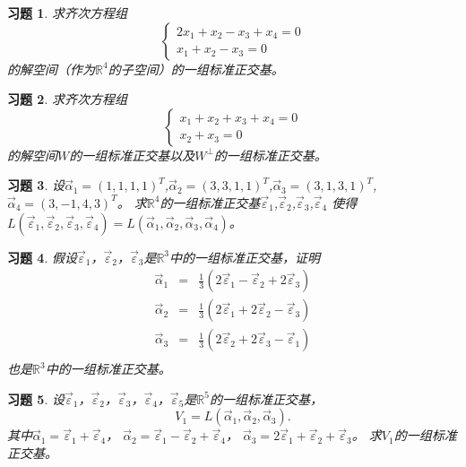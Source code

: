 \documentclass[a4paper]{book}
\newtheorem{ex}{习题}[chapter]
\begin{document}
\begin{ex}\label{6.13}
求齐次方程组
\begin{equation*}
  \begin{cases}
  2x_1+x_2-x_3+x_4=0\\
  x_1+x_2-x_3=0
  \end{cases}
\end{equation*}
的解空间（作为$\mathbb{R}^4$的子空间）的一组标准正交基。
\end{ex}

\begin{ex}\label{6.14}
求齐次方程组
\begin{equation*}
  \begin{cases}
  x_1+x_2+x_3+x_4=0\\
  x_2+x_3=0
  \end{cases}
\end{equation*}
的解空间$W$的一组标准正交基以及$W^{\bot}$的一组标准正交基。
\end{ex}

\begin{ex}\label{6.15}
设$\vec{\alpha}_1=(1,1,1,1)^T$,$\vec{\alpha}_2=(3,3,1,1)^T$,$\vec{\alpha}_3=(3,1,3,1)^T$,$\vec{\alpha}_4=(3,-1,4,3)^T$。
求$\mathbb{R}^4$的一组标准正交基$\vec{\varepsilon}_1$,$\vec{\varepsilon}_2$,$\vec{\varepsilon}_3$,$\vec{\varepsilon}_4$ 使得\\
$L(\vec{\varepsilon}_1,\vec{\varepsilon}_2,\vec{\varepsilon}_3,\vec{\varepsilon}_4)=L(\vec{\alpha}_1,\vec{\alpha}_2,\vec{\alpha}_3,\vec{\alpha}_4)$。
\end{ex}

\begin{ex}\label{6.16}
假设$\vec{\varepsilon}_1$，$\vec{\varepsilon}_2$，$\vec{\varepsilon}_3$是$\mathbb{R}^3$中的一组标准正交基，证明
\begin{eqnarray*}
 \vec{\alpha}_1 &=& \frac{1}{3}(2\vec{\varepsilon}_1-\vec{\varepsilon}_2+2\vec{\varepsilon}_3) \\
 \vec{\alpha}_2 &=& \frac{1}{3}(2\vec{\varepsilon}_1+2\vec{\varepsilon}_2-\vec{\varepsilon}_3) \\
 \vec{\alpha}_3 &=& \frac{1}{3}(2\vec{\varepsilon}_2+2\vec{\varepsilon}_3-\vec{\varepsilon}_1) \\
\end{eqnarray*}
也是$\mathbb{R}^3$中的一组标准正交基。
\end{ex}

\begin{ex}\label{6.17}
设$\vec{\varepsilon}_1$，$\vec{\varepsilon}_2$，$\vec{\varepsilon}_3$，$\vec{\varepsilon}_4$，$\vec{\varepsilon}_5$是$\mathbb{R}^5$的一组标准正交基，
\begin{equation*}
  V_1=L(\vec{\alpha}_1,\vec{\alpha}_2,\vec{\alpha}_3).
\end{equation*}
其中$\vec{\alpha}_1=\vec{\varepsilon}_1+\vec{\varepsilon}_4$，
$\vec{\alpha}_2=\vec{\varepsilon}_1-\vec{\varepsilon}_2+\vec{\varepsilon}_4$，
$\vec{\alpha}_3=2\vec{\varepsilon}_1+\vec{\varepsilon}_2+\vec{\varepsilon}_3$。
求$V_1$的一组标准正交基。
\end{ex}
\end{document}
